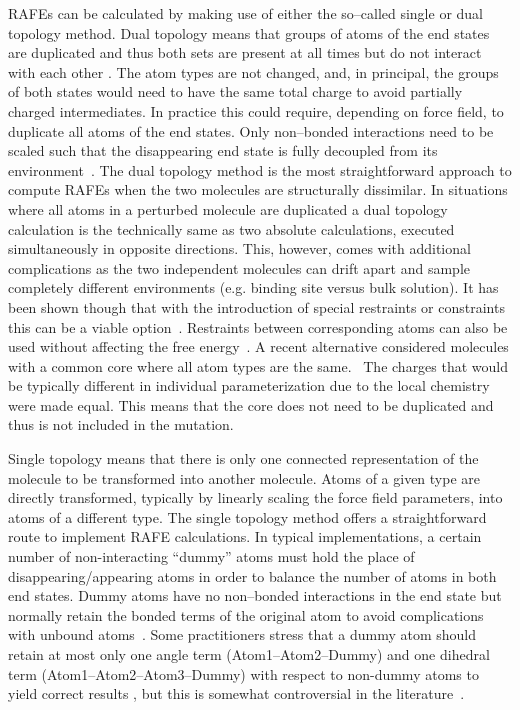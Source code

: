 \documentclass[journal=jctcce,manuscript=article]{achemso}
\begin{document}
RAFEs can be calculated by making use of either the so--called single or dual topology method.
Dual topology means that groups of atoms of the end states are
duplicated and thus both sets are present at all
times but do not interact with each other \cite{doi:10.1021/j100056a020, doi:10.1021/jp981628n}.  The atom types are not changed, and, in principal, the groups
of both states would need to have the same total charge to avoid partially
charged intermediates.  In practice this could require, depending on force field,
to duplicate all atoms of the end states.  Only non--bonded
interactions need to be scaled such that the disappearing end state
is fully decoupled from its environment~\cite{doi:10.1021/jp981628n}.
The dual topology method is the most straightforward approach to compute RAFEs when the two molecules are structurally dissimilar.
In situations where all atoms in a perturbed molecule are duplicated a dual topology calculation is the technically same as two absolute calculations, executed simultaneously in opposite directions.
This, however, comes with additional complications as the two independent
molecules can drift apart and sample completely different environments (e.g. binding site versus bulk solution).
It has been shown though that with the introduction of
special restraints or constraints this can be a viable
option~\cite{doi:10.1021/ct700081t, rocklin_separated_2013, JCC:Axelsen-Li}.
Restraints between corresponding atoms can also be used without affecting the free
energy~\cite{JCC:Axelsen-Li}.  A recent
alternative considered molecules with a
common core where all atom types are the same.~\cite{acs.jctc.6b00794}  The charges that would be
typically different in individual parameterization due to the local chemistry
were made equal.  This means that the core does not need to be duplicated and
thus is not included in the mutation.

Single topology means that there is only one connected representation of the molecule to be transformed into another molecule.
Atoms of a given type are directly transformed, typically by linearly scaling the force field parameters, into atoms of a different type.
The single topology method offers a straightforward route to implement RAFE calculations.\cite{doi:10.1021/j100056a020,Michel2010,doi:10.1063/1.449208, doi:10.1021/jp981628n}
In typical implementations,
a certain number of non-interacting ``dummy'' atoms must hold the place of disappearing/appearing atoms in order to balance the number of atoms in both end states.
Dummy atoms have no non--bonded interactions in the end state but normally retain the bonded
terms of the original atom to avoid complications with unbound
atoms~\cite{doi:10.1021/jp981628n}.
Some practitioners stress that a dummy atom should retain at most only
one angle term (Atom1--Atom2--Dummy) and one dihedral term
(Atom1--Atom2--Atom3--Dummy) with respect to non-dummy atoms
to yield correct results \cite{doi:10.1021/jp981628n,doi:10.1021/jp994193s}, but this is somewhat controversial in the literature~\cite{Boresch:2002:Mol.Simul.}.
\end{document}
